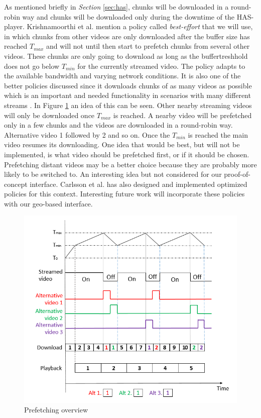 As mentioned briefly in \textit{Section} \ref{sec:has}, chunks will be downloaded in a round-robin way and chunks will be downloaded only during the downtime of the HAS-player. Krishnamoorthi et al. \cite{bandawarePrefetch} mention a policy called \textit{best-effort} that we will use, in which chunks from other videos are only downloaded after the buffer size has reached $T_{max}$ and will not until then start to prefetch chunks from several other videos. These chunks are only going to download as long as the buffertreshhold does not go below $T_{min}$ for the currently streamed video. The policy adapts to the available bandwidth and varying network conditions. It is also one of the better policies discussed since it downloads chunks of as many videos as possible which is an important and needed functionality in scenarios with many different streams \cite{bandawarePrefetch}. In Figure \ref{fig:prefetch} an idea of this can be seen. Other nearby streaming videos will only be downloaded once $T_{max}$ is reached. A nearby video will be prefetched only in a few chunks and the videos are downloaded in a round-robin way. Alternative video 1 followed by 2 and so on. Once the $T_{min}$ is reached the main video resumes its downloading. One idea that would be best, but will not be implemented, is what video should be prefetched first, or if it should be chosen. Prefetching distant videos may be a better choice because they are probably more likely to be switched to. An interesting idea but not considered for our proof-of-concept interface. Carlsson et al. \cite{optimizedstreaming} has also designed and implemented optimized policies for this context. Interesting future work will incorporate these policies with our geo-based interface.

\begin{figure}[ht!]
\begin{center}
	\includegraphics[scale=0.6]{prefetch.png}
	\caption{Prefetching overview}
	\label{fig:prefetch}
\end{center}
\end{figure}

